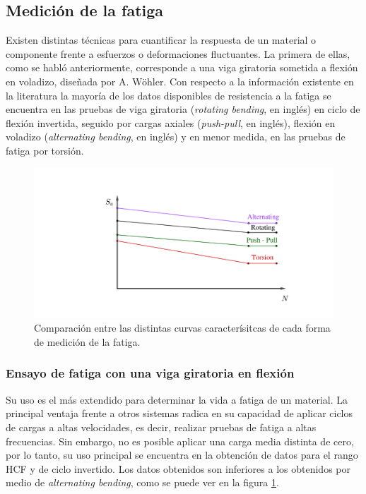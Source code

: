 \subsection{Medición de la fatiga}
Existen distintas técnicas para cuantificar la respuesta de un material o componente frente a esfuerzos o deformaciones fluctuantes. La primera de ellas, como se habló anteriormente, corresponde a una viga giratoria sometida a flexión en voladizo, diseñada por A. Wöhler. Con respecto a la información existente en la literatura la mayoría de los datos disponibles de resistencia a la fatiga se encuentra en las pruebas de viga giratoria (\textit{rotating bending}, en inglés) en ciclo de flexión invertida, seguido por cargas axiales (\textit{push-pull}, en inglés), flexión en voladizo (\textit{alternating bending}, en inglés) y en menor medida, en las pruebas de fatiga por torsión. \cite{norton2011machine}

\begin{figure}[h]
\centering
\includegraphics[width=0.9\linewidth, trim={11cm 2cm 6cm 4cm}, clip]{Imagenes/comp_medfat.pdf}
\caption{Comparación entre las distintas curvas caracterísitcas de cada forma de medición de la fatiga. \cite{lee2005fatigue}\cite{esin1980method}}
\label{fig:comp_medfat}
\end{figure}


\subsubsection{Ensayo de fatiga con una viga giratoria en flexión} 
Su uso es el más extendido para determinar la vida a fatiga de un material. La principal ventaja frente a otros sistemas radica en su capacidad de aplicar ciclos de cargas a altas velocidades, es decir, realizar pruebas de fatiga a altas frecuencias. Sin embargo, no es posible aplicar una carga media distinta de cero, por lo tanto, su uso principal se encuentra en la obtención de datos para el rango HCF y de ciclo invertido. Los datos obtenidos son inferiores a los obtenidos por medio de \textit{alternating bending}, como se puede ver en la figura \ref{fig:comp_medfat}.


